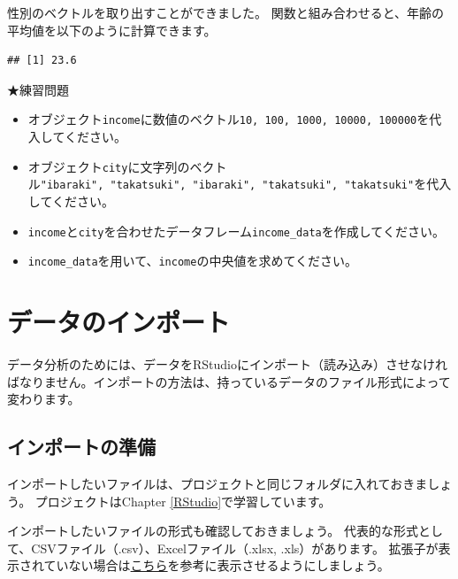 \documentclass[]{book}
\newenvironment{Shaded}{\begin{snugshade}}{\end{snugshade}}
\newcommand{\KeywordTok}[1]{\textcolor[rgb]{0.13,0.29,0.53}{\textbf{#1}}}
\newcommand{\OperatorTok}[1]{\textcolor[rgb]{0.81,0.36,0.00}{\textbf{#1}}}
\newcommand{\NormalTok}[1]{#1}
\providecommand{\tightlist}{%
  \setlength{\itemsep}{0pt}\setlength{\parskip}{0pt}}
\begin{document}
性別のベクトルを取り出すことができました。
関数と組み合わせると、年齢の平均値を以下のように計算できます。

\begin{Shaded}
\end{Shaded}

\begin{verbatim}
## [1] 23.6
\end{verbatim}

★練習問題

\begin{itemize}
\tightlist
\item
  オブジェクト\texttt{income}に数値のベクトル\texttt{10,\ 100,\ 1000,\ 10000,\ 100000}を代入してください。
\item
  オブジェクト\texttt{city}に文字列のベクトル\texttt{"ibaraki",\ "takatsuki",\ "ibaraki",\ "takatsuki",\ "takatsuki"}を代入してください。
\item
  \texttt{income}と\texttt{city}を合わせたデータフレーム\texttt{income\_data}を作成してください。
\item
  \texttt{income\_data}を用いて、\texttt{income}の中央値を求めてください。
\end{itemize}

\chapter{データのインポート}\label{ImportData}

データ分析のためには、データをRStudioにインポート（読み込み）させなければなりません。インポートの方法は、持っているデータのファイル形式によって変わります。

\section{インポートの準備}\label{ux30a4ux30f3ux30ddux30fcux30c8ux306eux6e96ux5099}

インポートしたいファイルは、プロジェクトと同じフォルダに入れておきましょう。
プロジェクトはChapter \ref{RStudio}で学習しています。

インポートしたいファイルの形式も確認しておきましょう。
代表的な形式として、CSVファイル（.csv）、Excelファイル（.xlsx,
.xls）があります。
拡張子が表示されていない場合は\href{https://pc-karuma.net/windows-10-show-explorer-file-name-extension/}{こちら}を参考に表示させるようにしましょう。
\end{document}
